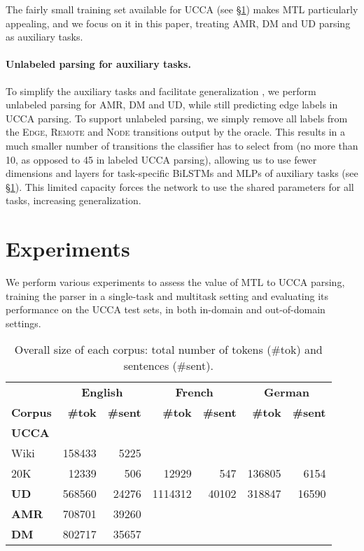 \documentclass[11pt,a4paper]{article}
\begin{document}
The fairly small training set available for UCCA (see \S\ref{sec:experiments})
makes MTL particularly appealing,
and we focus on it in this paper, treating AMR, DM and UD parsing as auxiliary tasks.

\paragraph{Unlabeled parsing for auxiliary tasks.}
To simplify the auxiliary tasks and facilitate generalization \cite{E17-2026,E17-1005},
we perform unlabeled parsing for AMR, DM and UD,
while still predicting edge labels in UCCA parsing.
To support unlabeled parsing, we simply remove all labels from the
\textsc{Edge}, \textsc{Remote} and \textsc{Node} transitions output by the oracle.
This results in a much smaller number of transitions the classifier has to select from
(no more than 10, as opposed to 45 in labeled UCCA parsing),
allowing us to use fewer dimensions and layers for task-specific BiLSTMs and MLPs
of auxiliary tasks (see \S\ref{sec:experiments}).
This limited capacity forces the network to use the shared parameters for all tasks,
increasing generalization.



\section{Experiments}\label{sec:experiments}

We perform various experiments to assess the value of MTL to UCCA parsing,
training the parser in a single-task and multitask setting
and evaluating its performance on the UCCA test sets, in both in-domain and out-of-domain settings.

\begin{table}[t]
\centering
\small
\setlength\tabcolsep{3pt}
\begin{tabular}{l|rr|rr|rr}
& \multicolumn{2}{c|}{\footnotesize \bf English} & \multicolumn{2}{c|}{\footnotesize \bf French} & \multicolumn{2}{c}{\footnotesize \bf German} \\
\footnotesize \bf Corpus & \footnotesize \bf {\#}tok & \footnotesize \bf {\#}sent & \footnotesize \bf {\#}tok & \footnotesize \bf {\#}sent & \footnotesize \bf {\#}tok & \footnotesize \bf {\#}sent \\
\hline
\textbf{UCCA} &&&& \\
Wiki & 158433 & 5225 &&&& \\
20K & 12339 & 506 & 12929 & 547 & 136805 & 6154 \\
\hline
\textbf{UD} & 568560 & 24276 & 1114312 & 40102 & 318847 & 16590 \\
\hline
\textbf{AMR} & 708701 & 39260 \\
\hline
\textbf{DM} & 802717 & 35657 \\
\end{tabular}
\caption{Overall size of each corpus: total number of tokens ({\#}tok) and sentences ({\#}sent).
\label{tab:corpora}}
\end{table}
\end{document}
